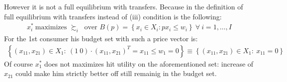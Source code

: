 \documentclass[a4paper]{article}
\begin{document}
However it is not a full equilibrium with transfers. Because in the definition of full equilibrium with transfers instead of (iii) condition is the following:
\begin{align*}
x_i^*\ \text{maximizes } \succsim_i\ \text{ over }B(p) = \left\{x_i \in X_i: px_i \le w_i \right\}\ \forall\ i = 1, \dots, I
\end{align*}
For the 1st consumer his budget set with such a price vector is:
\begin{align*}
\left\{(x_{11}, x_{21})\in X_1:\ (1\ 0)\cdot(x_{11}, x_{21})^T = x_{11} \le w_1 = 0\right\} \equiv \left\{(x_{11}, x_{21})\in X_1:\ x_{11} = 0 \right\}
\end{align*} 
Of course $x_1^*$ does not maximizes hit utility on the aforementioned set: increase of $x_{21}$ could make him strictly better off still remainig in the budget set.
\end{document}
